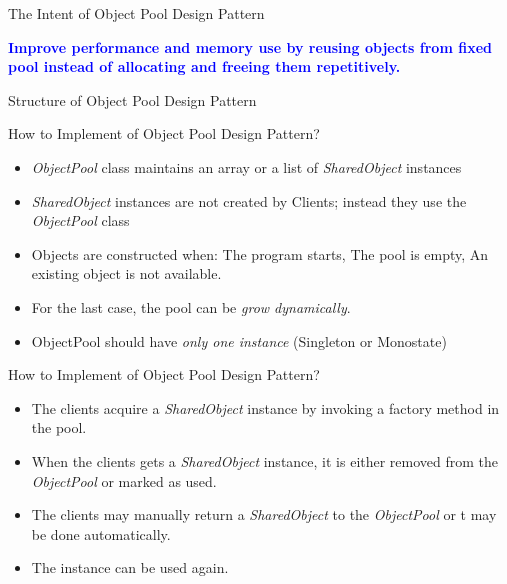 \documentclass[13pt]{beamer}
\begin{document}
\begin{frame}{The Intent of Object Pool Design Pattern}
	\begin{center}
	\textcolor{blue}{\textbf{Improve performance and memory use by reusing objects from fixed pool instead of allocating and freeing them repetitively.}}
	\end{center}
\end{frame}

\begin{frame}{Structure of Object Pool Design Pattern}
	\begin{center}
	\end{center}
\end{frame}

\begin{frame}{How to Implement of Object Pool Design Pattern?}
	\begin{itemize}
		\setlength\itemsep{1em}
		\item \emph{ObjectPool} class maintains an array or a list of \emph{SharedObject} instances
		\item \emph{SharedObject} instances are not created by Clients; instead they use the \emph{ObjectPool} class
		\item Objects are constructed when: The program starts, The pool is empty, An existing object is not available.
		\item For the last case, the pool can be \emph{grow dynamically}.
		\item ObjectPool should have \emph{only one instance} (Singleton or Monostate)
	\end{itemize}
\end{frame}

\begin{frame}{How to Implement of Object Pool Design Pattern?}
	\begin{itemize}
		\setlength\itemsep{1em}
		\item The clients acquire a \emph{SharedObject} instance by invoking a factory method in the pool.
		\item When the clients gets a \emph{SharedObject} instance, it is either removed from the \emph{ObjectPool} or marked as used.
		\item The clients may manually return a \emph{SharedObject} to the \emph{ObjectPool} or t may be done automatically.
		\item The instance can be used again.
	\end{itemize}
\end{frame}
\end{document}
